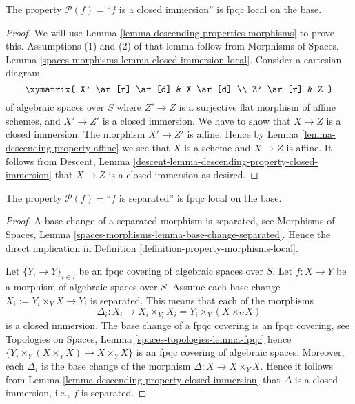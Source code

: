 \begin{lemma}
\label{lemma-descending-property-closed-immersion}
The property $\mathcal{P}(f) =$``$f$ is a closed immersion''
is fpqc local on the base.
\end{lemma}

\begin{proof}
We will use
Lemma \ref{lemma-descending-properties-morphisms}
to prove this. Assumptions (1) and (2) of that lemma follow from
Morphisms of Spaces,
Lemma \ref{spaces-morphisms-lemma-closed-immersion-local}.
Consider a cartesian diagram
$$
\xymatrix{
X' \ar[r] \ar[d] & X \ar[d] \\
Z' \ar[r] & Z
}
$$
of algebraic spaces over $S$
where $Z' \to Z$ is a surjective flat morphism of affine schemes,
and $X' \to Z'$ is a closed immersion. We have to show that $X \to Z$
is a closed immersion. The morphism $X' \to Z'$ is affine. Hence by
Lemma \ref{lemma-descending-property-affine}
we see that $X$ is a scheme and $X \to Z$ is affine.
It follows from
Descent, Lemma \ref{descent-lemma-descending-property-closed-immersion}
that $X \to Z$ is a closed immersion as desired.
\end{proof}

\begin{lemma}
\label{lemma-descending-property-separated}
The property $\mathcal{P}(f) =$``$f$ is separated''
is fpqc local on the base.
\end{lemma}

\begin{proof}
A base change of a separated morphism is separated, see
Morphisms of Spaces,
Lemma \ref{spaces-morphisms-lemma-base-change-separated}.
Hence the direct implication in
Definition \ref{definition-property-morphisms-local}.

\medskip\noindent
Let $\{Y_i \to Y\}_{i \in I}$ be an fpqc covering of algebraic spaces over $S$.
Let $f : X \to Y$ be a morphism of algebraic spaces over $S$.
Assume each base change $X_i := Y_i \times_Y X \to Y_i$ is separated.
This means that each of the morphisms
$$
\Delta_i :
X_i
\longrightarrow
X_i \times_{Y_i} X_i = Y_i \times_Y (X \times_Y X)
$$
is a closed immersion. The base change of a fpqc covering is an
fpqc covering, see
Topologies on Spaces, Lemma \ref{spaces-topologies-lemma-fpqc}
hence $\{Y_i \times_Y (X \times_Y X) \to X \times_Y X\}$
is an fpqc covering of algebraic spaces. Moreover, each
$\Delta_i$ is the base change of the morphism
$\Delta : X \to X \times_Y X$. Hence it follows from
Lemma \ref{lemma-descending-property-closed-immersion}
that $\Delta$ is a closed immersion, i.e., $f$ is separated.
\end{proof}

